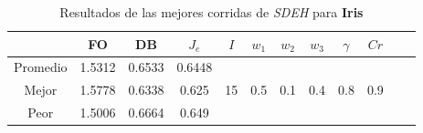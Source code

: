 \begin{table}[h!]
\footnotesize
\begin{center}
\begin{tabular}{|c|c|c|c|c|c|c|c|c|c|c|c|}
\hline
& {\bf FO} & {\bf DB}& $J_e$ & $I$ & $w_1$ & $w_2$ & $w_3$ & $\gamma$ & $Cr$ \\
\hline
\hline
Promedio   & 1.5312 & 0.6533  & 0.6448 &  &  &  &  &  & \\
\cline{1-4}
Mejor & 1.5778 & 0.6338  & 0.625 & 15 & 0.5 & 0.1 & 0.4 & 0.8 & 0.9\\
\cline{1-4}
Peor & 1.5006 & 0.6664  & 0.649 &  &  &  &  &  & \\\hline
\end{tabular}
\caption{Resultados de las mejores corridas de \emph{SDEH} para {\bf Iris}}
\label{tb:pmpsdehibcsv}
\end{center}
\end{table}
